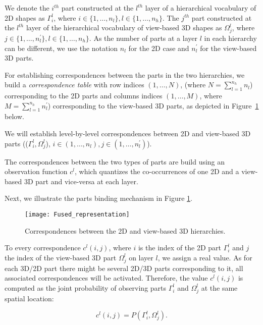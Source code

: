 \documentclass[runningheads]{llncs}
\begin{document}
We denote the $i^{th}$ part constructed at the $l^{th}$ layer of a  hierarchical vocabulary of 2D shapes as $\Gamma_{i}^{l}$, where $i \in \{1,\ldots,n_{l}\}, l \in \{1,\ldots,n_h\}$. The $j^{th}$ part constructed at the $l^{th}$ layer of the  hierarchical vocabulary of view-based 3D shapes as $\Omega_{j}^{l}$, where $j \in \{1,\ldots,n_{l}^{'}\}, {l} \in \{1,\ldots,n_h\}$. As the number of parts at a layer $l$ in each hierarchy can be different, we use the notation $n_l$ for the 2D case and $n_l^{'}$ for the view-based 3D parts. 

For establishing correspondences between the parts in the two hierarchies, we build a \emph{correspondence table} with row indices $(1,\dots,N)$, (where $N=\sum_{l=1}^{n_h} {n_l}$) corresponding to the 2D parts and columns indices $(1,\dots,M)$, where $M=\sum_{l=1}^{n_h} {n_{l}^ {'}}$) corresponding to the view-based 3D parts, as depicted in Figure~\ref{fig:fused-models} below. 

We will establish level-by-level correspondences between 2D and view-based 3D  parts (($\Gamma_{i}^l,\Omega_{j}^l$), $i \in (1,\ldots,n_l), j \in (1,\ldots,n_{l}^{'})$).

The correspondences between the two types of parts are build using an observation function $c^l$, which quantizes the co-occurrences of one 2D and a view-based 3D part and vice-versa at each layer. 

Next, we illustrate the parts binding mechanism in Figure \ref{fig:fused-models}.

\begin{figure}
\begin{center}
\texttt{[image: Fused\_representation]}
\end{center}
\caption{Correspondences between the 2D and view-based 3D hierarchies.}
\label{fig:fused-models}
\end{figure}

To every correspondence $c^l(i,j)$, where $i$ is the index of the 2D part $\Gamma_i^l$ and $j$ the index of the view-based 3D part $\Omega_j^l$ on layer $l$, we assign a real value. As for each 3D/2D part there might be several 2D/3D parts corresponding to it, all associated correspondences will be activated. Therefore, the value $c^l(i,j)$ is computed as the joint probability of observing parts $\Gamma_i^l$ and $\Omega_j^l$ at the same spatial location:

\begin{equation}
  c^l(i,j) = P(\Gamma_i^l,\Omega_j^l). 
 \end{equation} 
\end{document}
